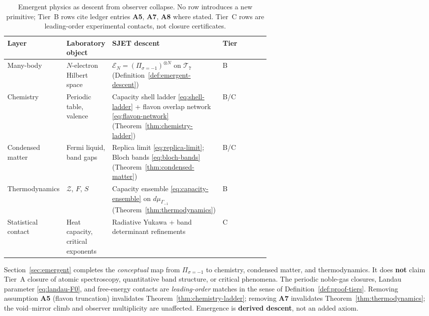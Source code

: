 \begin{table}[ht]
\centering
\small
\renewcommand{\arraystretch}{1.12}
\begin{tabular}{@{}llp{0.28\linewidth}p{0.34\linewidth}@{}}
\toprule
\textbf{Layer} & \textbf{Laboratory object} & \textbf{SJET descent} &
\textbf{Tier} \\
\midrule
Many-body &
  $N$-electron Hilbert space &
  $\mathcal{E}_N=(\Pi_{\sigma=-1})^{\otimes N}$ on $\mathcal{T}_7$
  (Definition~\ref{def:emergent-descent}) &
  B \\
\addlinespace
Chemistry &
  Periodic table, valence &
  Capacity shell ladder \eqref{eq:shell-ladder} + flavon overlap network
  \eqref{eq:flavon-network} (Theorem~\ref{thm:chemistry-ladder}) &
  B/C \\
\addlinespace
Condensed matter &
  Fermi liquid, band gaps &
  Replica limit \eqref{eq:replica-limit}; Bloch bands
  \eqref{eq:bloch-bands} (Theorem~\ref{thm:condensed-matter}) &
  B/C \\
\addlinespace
Thermodynamics &
  $\mathcal{Z}$, $F$, $S$ &
  Capacity ensemble \eqref{eq:capacity-ensemble} on $d\mu_{\Gamma_{-1}}$
  (Theorem~\ref{thm:thermodynamics}) &
  B \\
\addlinespace
Statistical contact &
  Heat capacity, critical exponents &
  Radiative Yukawa + band determinant refinements &
  C \\
\bottomrule
\end{tabular}
\caption{Emergent physics as descent from observer collapse. No row introduces
a new primitive; Tier~B rows cite ledger entries \textbf{A5}, \textbf{A7},
\textbf{A8} where stated. Tier~C rows are leading-order experimental contacts,
not closure certificates.}
\label{tab:emergent-map}
\end{table}

\begin{remark}
\label{rmk:emergent-honest}
Section~\ref{sec:emergent} completes the \emph{conceptual} map from
$\Pi_{\sigma=-1}$ to chemistry, condensed matter, and thermodynamics. It does
\textbf{not} claim Tier~A closure of atomic spectroscopy, quantitative band
structure, or critical phenomena. The periodic noble-gas closures, Landau
parameter \eqref{eq:landau-F0}, and free-energy contacts are
\emph{leading-order} matches in the sense of Definition~\ref{def:proof-tiers}.
Removing assumption \textbf{A5} (flavon truncation) invalidates
Theorem~\ref{thm:chemistry-ladder}; removing \textbf{A7} invalidates
Theorem~\ref{thm:thermodynamics}; the void--mirror climb and observer
multiplicity are unaffected. Emergence is \textbf{derived descent}, not an
added axiom.
\end{remark}